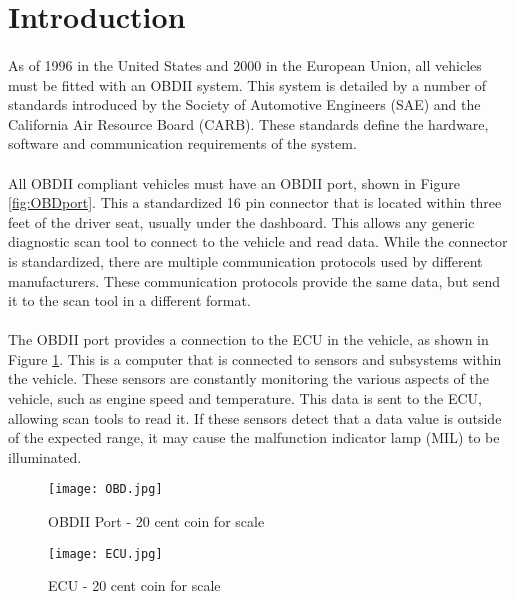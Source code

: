 \section{Introduction}
	\paragraph{}{
	As of 1996 in the United States and 2000 in the European Union, all vehicles must be fitted with an OBDII system. This system is detailed by a number of standards introduced by the Society of Automotive Engineers (SAE) and the California Air Resource Board (CARB). These standards define the hardware, software and communication requirements of the system.
	}
	\paragraph{}{
	All OBDII compliant vehicles must have an OBDII port, shown in Figure \ref{fig:OBDport}. This a standardized 16 pin connector that is located within three feet of the driver seat, usually under the dashboard. This allows any generic diagnostic scan tool to connect to the vehicle and read data. While the connector is standardized, there are multiple communication protocols used by different manufacturers. These communication protocols provide the same data, but send it to the scan tool in a different format.
	}
	\paragraph{}{
	The OBDII port provides a connection to the ECU in the vehicle, as shown in Figure \ref{fig:ECU}. This is a computer that is connected to sensors and subsystems within the vehicle. These sensors are constantly monitoring the various aspects of the vehicle, such as engine speed and temperature. This data is sent to the ECU, allowing scan tools to read it. If these sensors detect that a data value is outside of the expected range, it may cause the malfunction indicator lamp (MIL) to be illuminated.
	}
	\begin{figure}[h]
		\begin{center}								
			\begin{minipage}{0.45\textwidth}
				\texttt{[image: OBD.jpg]}
				\caption{OBDII Port - 20 cent coin for scale}						
				\label{fig:OBDport}
			\end{minipage}
			\hfill			
			\begin{minipage}{0.45\textwidth}
				\texttt{[image: ECU.jpg]}
				\caption{ECU - 20 cent coin for scale}
				\label{fig:ECU}
			\end{minipage}									
		\end{center}
	\end{figure}	
\newpage
